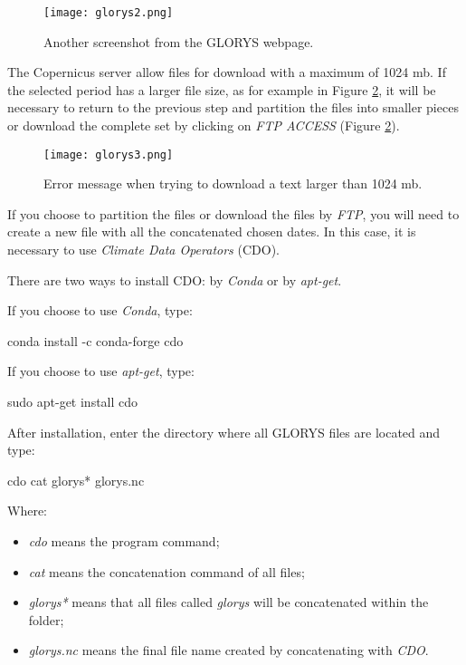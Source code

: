 \begin{figure}[H]
    \centering
    \texttt{[image: glorys2.png]}
    \caption{Another screenshot from the GLORYS webpage.}
    \label{glorys2}
\end{figure}
\bigskip

\noindent The Copernicus server allow files for download with a maximum of 1024 mb. 
If the selected period has a larger file size, as for example in Figure \textcolor{bleu_cite}{\ref{glorys3}}, it will be necessary to 
return to the previous step and partition the files into smaller pieces or download the complete set by clicking on \textit{FTP ACCESS}
(Figure \textcolor{bleu_cite}{\ref{glorys3}}).
\bigskip

\begin{figure}[H]
    \centering
    \texttt{[image: glorys3.png]}
    \caption{Error message when trying to download a text larger than 1024 mb.}
    \label{glorys3}
\end{figure}
\bigskip

\noindent If you choose to partition the files or download the files by \textit{FTP}, you will need to create a new file with 
all the concatenated chosen dates. In this case, it is necessary to use \textit{Climate Data Operators} (CDO).
\bigskip

\noindent There are two ways to install CDO: by \textit{Conda} or by \textit{apt-get}.
\bigskip

\noindent If you choose to use \textit{Conda}, type:
\bigskip

\begin{bashcode}
conda install -c conda-forge cdo
\end{bashcode}
\bigskip

\noindent If you choose to use \textit{apt-get}, type:
\bigskip

\begin{bashcode}
sudo apt-get install cdo
\end{bashcode}
\bigskip

\noindent After installation, enter the directory where all GLORYS files are located and type:
\bigskip

\begin{bashcode}
cdo cat glorys* glorys.nc
\end{bashcode}
\bigskip

\noindent Where: 
\bigskip

\begin{itemize}
    \item  \textit{cdo} means the program command;
    \item \textit{cat} means the concatenation command of all files;
    \item \textit{glorys*} means that all files called \textit{glorys} will be concatenated within the folder;
    \item \textit{glorys.nc} means the final file name created by concatenating with \textit{CDO}.
\end{itemize}
\bigskip

